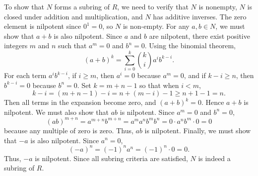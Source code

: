 \documentclass{article}
\begin{document}
To show that \(N\) forms a subring of \(R\), we need to verify that \(N\) is nonempty, \(N\) is closed under addition and multiplication, and \(N\) has additive inverses. The zero element is nilpotent since \(0^1=0\), so \(N\) is non-empty. For any \(a,b\in N\), we must show that \(a+b\) is also nilpotent. Since \(a\) and \(b\) are nilpotent, there exist positive integers \(m\) and \(n\) such that \(a^m=0\) and \(b^n=0\). Using the binomial theorem,
\[(a+b)^k=\sum_{i=0}^k {k \choose i} a^ib^{k-i}.\]
For each term \(a^i b^{k-i}\), if \(i\geq m\), then \(a^i=0\) because \(a^m=0\), and if \(k-i\geq n\), then \(b^{k-i}=0\) because \(b^n=0\). Set \(k=m+n-1\) so that when \(i<m\),
\[k-i=(m+n-1)-i= n+(m-i)-1\geq n+1-1 = n.\]
Then all terms in the expansion become zero, and \((a+b)^k=0\). Hence \(a+b\) is nilpotent. We must also show that \(ab\) is nilpotent. Since \(a^m=0\) and \(b^n=0\), 
\[(ab)^{m+n}=a^{m+n}b^{m+n}=a^ma^nb^mb^n=0\cdot a^nb^m\cdot 0=0\]
because any multiple of zero is zero. Thus, \(ab\) is nilpotent. Finally, we must show that \(-a\) is also nilpotent. Since \(a^n=0\),
\[(-a)^n=(-1)^n a^n=(-1)^n\cdot 0=0.\]
Thus, \(-a\) is nilpotent. Since all subring criteria are satisfied, \(N\) is indeed a subring of \(R\).
\end{document}

